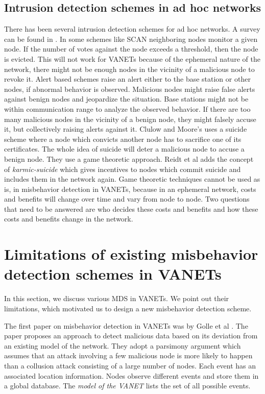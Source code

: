 \documentclass[conference]{IEEEtran}[10pt]
\begin{document}
\subsection{Intrusion detection schemes in ad hoc networks}
\label{subsec:IDS}
There has been several intrusion detection schemes for ad hoc networks. A survey can be found in \cite{AW08}. 
In some schemes like SCAN \cite{RBK05,YSML06} neighboring nodes monitor a given node. 
If the number of votes against the node exceeds a threshold, then the node is evicted. 
This will not work for VANETs because of the ephemeral nature of the network, 
there might not be enough nodes in the vicinity of a malicious node
to revoke it. Alert based schemes \cite{GS04,ZYN08} raise an alert either to the base station or other nodes, 
if abnormal behavior is observed.  
Malicious nodes might raise false alerts against benign nodes and jeopardize the situation. 
Base stations might not be within communication range to analyze the observed behavior. 
If there are too many malicious nodes in the vicinity of a benign node, they might falsely accuse it, but collectively raising alerts against it. 
Clulow and Moore's \cite{CM06} uses a suicide scheme where a node which convicts another node has to sacrifice one of its certificates. 
The whole idea of suicide will deter a malicious node to accuse a benign node. 
They use a game theoretic approach. 
Reidt et al \cite{RSB09} adds the concept of \emph{karmic-suicide} which gives incentives to nodes which commit suicide and
includes them in the network again. 
Game theoretic techniques cannot be used as is, in misbehavior detection in VANETs, because in an ephemeral network, 
costs and benefits will change over time and vary from node to node. 
Two questions that need to be answered are who decides these costs and benefits and how these costs and benefits change in the network. 


\section{Limitations of existing misbehavior detection schemes in VANETs}
\label{sec:existing_MDS}
In this section, we discuss various MDS in VANETs. We point out their limitations, which motivated us
to design a new misbehavior detection scheme. 

The first paper on misbehavior detection in VANETs was by Golle et al \cite{GGS04}. 
The paper proposes an approach to detect malicious data based on its deviation from an existing  model of the network. 
They adopt a parsimony argument which assumes that an attack involving a few malicious node is 
more likely to happen than a collusion attack consisting of a large number of nodes. 
Each event has an associated location information. 
Nodes observe different events and store them in a global database. 
The \emph{model of the VANET} lists the set of all possible events. 
\end{document}
